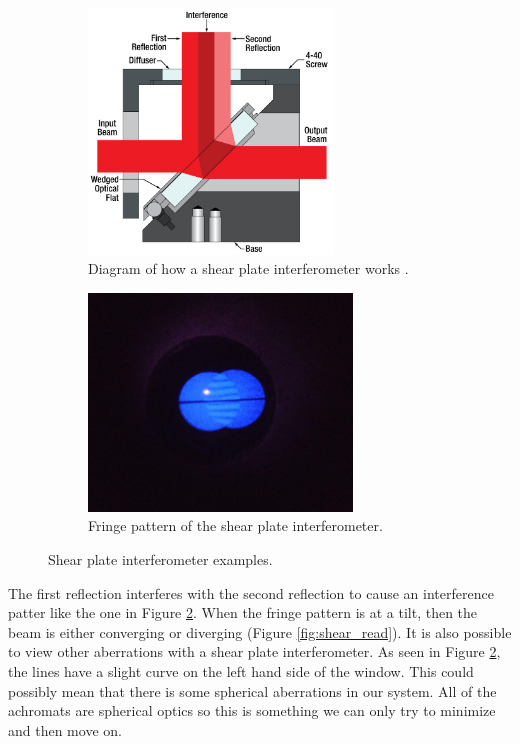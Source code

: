\begin{figure}[H]
\centering
\begin{subfigure}{.5\textwidth}
  \centering
  \includegraphics[width=6.5cm]{Figures/ShearPlateDrawing.jpg}
  \caption{Diagram of how a shear plate interferometer works \cite{ShearingInterferometers}.}
  \label{fig:shearplate}
\end{subfigure}%
\begin{subfigure}{.5\textwidth}
  \centering
  \includegraphics[width=7cm]{Figures/fringes.jpg}
  \caption{Fringe pattern of the shear plate interferometer.}
  \label{fig:fringes}
\end{subfigure}
\caption{Shear plate interferometer examples.}
\label{fig:shear_images}
\end{figure}

The first reflection interferes with the second reflection to cause an interference patter like the one in Figure \ref{fig:fringes}.  When the fringe pattern is at a tilt, then the beam is either converging or diverging (Figure \ref{fig:shear_read}).  It is also possible to view other aberrations with a shear plate interferometer.  As seen in Figure \ref{fig:fringes}, the lines have a slight curve on the left hand side of the window.  This could possibly mean that there is some spherical aberrations in our system.  All of the achromats are spherical optics so this is something we can only try to minimize and then move on. 


